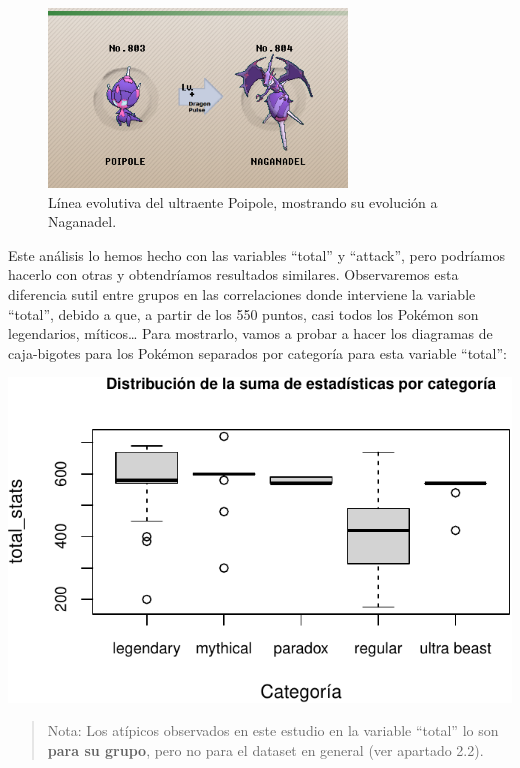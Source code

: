 \documentclass[
  12pt,
]{extreport}
\begin{document}
\begin{itemize}
\begin{figure}[H]
  {\centering \includegraphics[width=3.125in,height=\textheight]{trabajo_images/Naganadel.png}

  }

  \caption{Línea evolutiva del ultraente Poipole, mostrando su evolución
  a Naganadel.}

  \end{figure}%
\end{itemize}

Este análisis lo hemos hecho con las variables ``total'' y ``attack'',
pero podríamos hacerlo con otras y obtendríamos resultados similares.
Observaremos esta diferencia sutil entre grupos en las correlaciones
donde interviene la variable ``total'', debido a que, a partir de los
550 puntos, casi todos los Pokémon son legendarios, míticos\ldots{} Para
mostrarlo, vamos a probar a hacer los diagramas de caja-bigotes para los
Pokémon separados por categoría para esta variable ``total'':

\begin{center}
\includegraphics{trabajo_files/figure-pdf/unnamed-chunk-20-1.pdf}
\end{center}

\begin{quote}
Nota: Los atípicos observados en este estudio en la variable ``total''
lo son \textbf{para su grupo}, pero no para el dataset en general (ver
apartado 2.2).
\end{quote}
\end{document}
